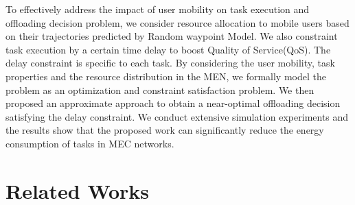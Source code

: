 \documentclass[conference]{IEEEtran}
\begin{document}
To effectively address the impact of user mobility on task execution and offloading decision problem, we consider resource allocation to mobile users based on their trajectories predicted by Random waypoint Model. We also constraint task execution by a certain time delay to boost Quality of Service(QoS). The delay constraint is specific to each task. By considering the user mobility, task properties and the resource distribution in the MEN, we formally model the problem as an optimization and constraint satisfaction problem. We then proposed an approximate approach to obtain a near-optimal offloading decision satisfying the delay constraint. We conduct extensive simulation experiments and the results show that the proposed work can significantly reduce the energy consumption of tasks in MEC networks.


\section{Related Works}
\end{document}

